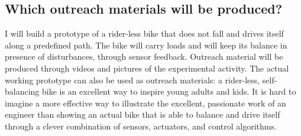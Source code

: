 \documentclass[]{article}
\begin{document}
\subsection{Which outreach materials will be produced?}

I will build a prototype of a rider-less bike that does not fall and drives itself along a predefined path. The bike will carry loads and will keep its balance in presence of disturbances, through sensor feedback. Outreach material will be produced through videos and pictures of the experimental activity. The actual working prototype can also be used as outreach materials: a rider-less, self-balancing bike is an excellent way to inspire young adults and kids. It is hard to imagine a more effective way to illustrate the excellent, passionate work of an engineer than showing an actual bike that is able to balance and drive itself through a clever combination of sensors, actuators, and control algorithms.
\end{document}
